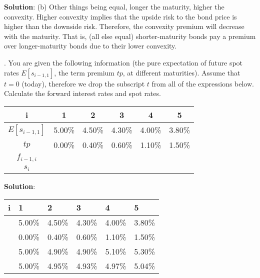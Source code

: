 \documentclass[11.5pt]{article}
\begin{document}
\noindent \textbf{Solution}: (b)  Other things being equal, longer the maturity, higher the convexity. Higher convexity implies that the upside risk to the bond price is higher than the downside risk. Therefore, the convexity premium will decrease with the maturity. That is, (all else equal) shorter-maturity bonds pay a premium over longer-maturity bonds due to their lower convexity.

\vspace{30pt}







. You are given the following information (the pure expectation of future spot rates $E[s_{i-1,1}]$, the term premium $tp$, at different maturities). Assume that $t = 0$ (today), therefore we drop the subscript $t$ from all of the expressions below. Calculate the forward interest rates and spot rates.

\begin{table}[h]
	\begin{tabular}{cccccc}
		i & 1      & 2      & 3      & 4      & 5      \\ \hline
	$E[s_{i-1,1}]$	& 5.00\% & 4.50\% & 4.30\% & 4.00\% & 3.80\% \\
	$tp$	& 0.00\% & 0.40\% & 0.60\% & 1.10\% & 1.50\% \\
	$f_{i-1,i}$	&        &        &        &        &        \\
	$s_i$	&        &        &        &        &        \\ \hline
	\end{tabular}
\end{table}


\noindent \textbf{Solution}:  
\begin{table}[h]
	\begin{tabular}{llllll}
		i & 1      & 2      & 3      & 4      & 5      \\ \hline
		& 5.00\% & 4.50\% & 4.30\% & 4.00\% & 3.80\% \\
		& 0.00\% & 0.40\% & 0.60\% & 1.10\% & 1.50\% \\
		& 5.00\% & 4.90\% & 4.90\% & 5.10\% & 5.30\% \\
		& 5.00\% & 4.95\% & 4.93\% & 4.97\% & 5.04\% \\ \hline
	\end{tabular}
\end{table}


\vspace{70pt}
\end{document}
